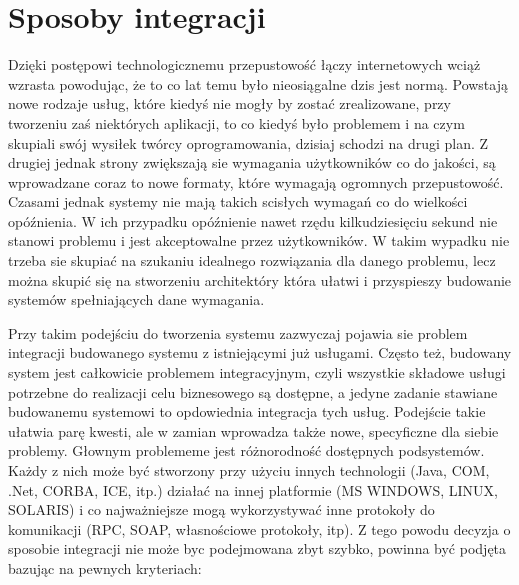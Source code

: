 \section{Sposoby integracji}
Dzięki postępowi technologicznemu przepustowość łączy internetowych wciąż wzrasta powodując, że to co lat temu było nieosiągalne dzis jest normą. Powstają nowe rodzaje usług, które kiedyś nie mogły by zostać zrealizowane, przy tworzeniu zaś niektórych aplikacji, to co kiedyś było problemem i na czym skupiali swój wysiłek twórcy oprogramowania, dzisiaj schodzi na drugi plan. Z drugiej jednak strony zwiększają sie wymagania użytkowników co do jakości, są wprowadzane coraz to nowe formaty, które wymagają ogromnych przepustowość. Czasami jednak systemy nie mają takich scisłych wymagań co do wielkości opóźnienia. W ich przypadku opóźnienie nawet rzędu kilkudziesięciu sekund nie stanowi problemu i jest akceptowalne przez użytkowników. W takim wypadku nie trzeba sie skupiać na szukaniu idealnego rozwiązania dla danego problemu, lecz można skupić się na stworzeniu architektóry która ułatwi i przyspieszy budowanie systemów spełniających dane wymagania.

Przy takim podejściu do tworzenia systemu zazwyczaj pojawia sie problem integracji budowanego systemu z istniejącymi już usługami. Często też, budowany system jest całkowicie problemem integracyjnym, czyli wszystkie składowe usługi potrzebne do realizacji celu biznesowego są dostępne, a jedyne zadanie stawiane budowanemu systemowi to opdowiednia integracja tych usług. Podejście takie ułatwia parę kwesti, ale w zamian wprowadza także nowe, specyficzne dla siebie problemy. Głownym problememe jest różnorodność dostępnych podsystemów. Każdy z nich może być stworzony przy użyciu innych technologii (Java, COM, .Net, CORBA, ICE, itp.) działać na innej platformie (MS WINDOWS, LINUX, SOLARIS) i co najważniejsze mogą wykorzystywać inne protokoły do komunikacji (RPC, SOAP, własnościowe protokoły, itp). Z tego powodu decyzja o sposobie integracji nie może byc podejmowana zbyt szybko,  powinna być podjęta bazując na pewnych kryteriach:  \cite{hohpewoolf2003} 

